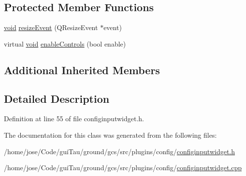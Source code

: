 \subsection*{Protected Member Functions}
\begin{DoxyCompactItemize}
\item 
\hyperlink{group___u_a_v_objects_plugin_ga444cf2ff3f0ecbe028adce838d373f5c}{void} \hyperlink{group___config_plugin_ga46ca6ec855581471ed30c902b43371cf}{resize\-Event} (Q\-Resize\-Event $\ast$event)
\item 
virtual \hyperlink{group___u_a_v_objects_plugin_ga444cf2ff3f0ecbe028adce838d373f5c}{void} \hyperlink{group___config_plugin_ga39ced7c878bb56024b9bdd2bdb90d68f}{enable\-Controls} (bool enable)
\end{DoxyCompactItemize}
\subsection*{Additional Inherited Members}


\subsection{Detailed Description}


Definition at line 55 of file configinputwidget.\-h.



The documentation for this class was generated from the following files\-:\begin{DoxyCompactItemize}
\item 
/home/jose/\-Code/gui\-Tau/ground/gcs/src/plugins/config/\hyperlink{configinputwidget_8h}{configinputwidget.\-h}\item 
/home/jose/\-Code/gui\-Tau/ground/gcs/src/plugins/config/\hyperlink{configinputwidget_8cpp}{configinputwidget.\-cpp}\end{DoxyCompactItemize}
